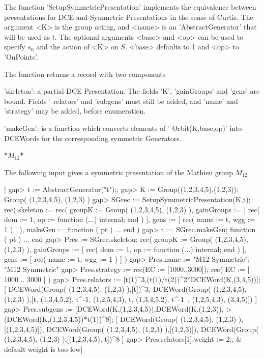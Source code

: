 The     function  'SetupSymmetricPresentation' implements the equivalence
between presentations for DCE and Symmetric Presentations in the sense of
Curtis.  The  argument  <K>  is  the group   acting,  and <name>   is  an
'AbstractGenerator' that will be    used as $t$. The  optional  arguments
<base>  and <op> can be used  to specify $s_0$ and the  action  of <K> on
$S$. <base> defaults to 1 and <op> to 'OnPoints'.

The function returns a record with two components\:

'skeleton': a partial DCE Presentation.  The fields 'K', 'gainGroups' and
'gens' are bound.  Fields ' relators'  and 'subgens' must still be added,
and 'name' and 'strategy' may be added, before enumeration.

'makeGen': is a function which  converts elements of '  Orbit(K,base,op)'
into DCEWords for the corresponding symmetric Generators.


*$M_{12}$*

The following input gives a symmetric presentation of the Mathieu
group $M_{12}$\:

|    gap> t := AbstractGenerator("t");;
    gap> K := Group((1,2,3,4,5),(1,2,3));
    Group( (1,2,3,4,5), (1,2,3) )
    gap> SGrec := SetupSymmetricPresentation(K,t);
    rec(
      skeleton := rec(
          groupK := Group( (1,2,3,4,5), (1,2,3) ),
          gainGroups := [ rec(
                  dom := 1,
                  op := function (...) internal; end ) ],
          gens := [ rec(
                  name := t,
                  wgg := 1 ) ] ),
      makeGen := function ( pt ) ... end )
    gap> t := SGrec.makeGen;
    function ( pt ) ... end
    gap> Pres := SGrec.skeleton;
    rec(
      groupK := Group( (1,2,3,4,5), (1,2,3) ),
      gainGroups := [ rec(
              dom := 1,
              op := function (...) internal; end ) ],
      gens := [ rec(
              name := t,
              wgg := 1 ) ] )
    gap> Pres.name := "M12 Symmetric";
    "M12 Symmetric"
    gap> Pres.strategy := rec(EC := [1000..3000]);
    rec(
      EC := [ 1000 .. 3000 ] )
    gap> Pres.relators := [t(1)^3,(t(1)/t(2))^2*DCEWord(K,(3,4,5))];
    [ DCEWord(Group( (1,2,3,4,5), (1,2,3) ),[t])^3,
      DCEWord(Group( (1,2,3,4,5),
        (1,2,3) ),[t, (1,3,4,5,2), t^-1, (1,2,5,4,3), t, (1,3,4,5,2), t^-1\
    , (1,2,5,4,3), (3,4,5)]) ]
    gap> Pres.subgens := [DCEWord(K,(1,2,3,4,5)),DCEWord(K,(1,2,3)),
    >                  (DCEWord(K,(1,2,3,4,5))*t(1))^8];
    [ DCEWord(Group( (1,2,3,4,5), (1,2,3) ),[(1,2,3,4,5)]),
      DCEWord(Group( (1,2,3,4,5), (1,2,3) ),[(1,2,3)]),
      DCEWord(Group( (1,2,3,4,5), (1,2,3) ),[(1,2,3,4,5), t])^8 ]
    gap> Pres.relators[1].weight := 2;;   & default weight is too low|

